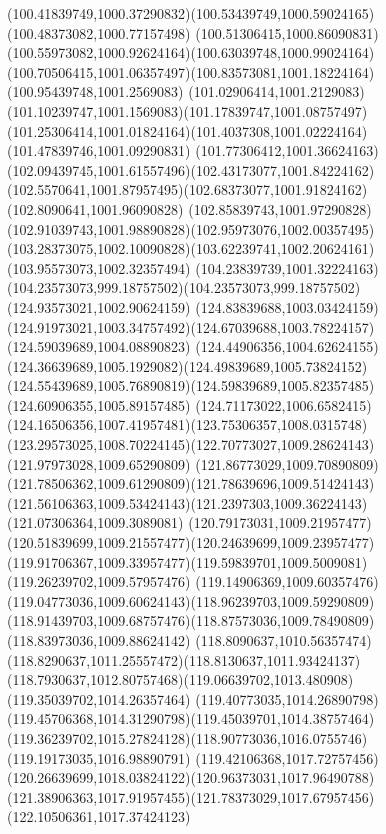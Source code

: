 {    \curveto(100.41839749,1000.37290832)(100.53439749,1000.59024165)(100.48373082,1000.77157498)
    \curveto(100.51306415,1000.86090831)(100.55973082,1000.92624164)(100.63039748,1000.99024164)
    \curveto(100.70506415,1001.06357497)(100.83573081,1001.18224164)(100.95439748,1001.2569083)
    \curveto(101.02906414,1001.2129083)(101.10239747,1001.1569083)(101.17839747,1001.08757497)
    \curveto(101.25306414,1001.01824164)(101.4037308,1001.02224164)(101.47839746,1001.09290831)
    \curveto(101.77306412,1001.36624163)(102.09439745,1001.61557496)(102.43173077,1001.84224162)
    \curveto(102.5570641,1001.87957495)(102.68373077,1001.91824162)(102.8090641,1001.96090828)
    \curveto(102.85839743,1001.97290828)(102.91039743,1001.98890828)(102.95973076,1002.00357495)
    \curveto(103.28373075,1002.10090828)(103.62239741,1002.20624161)(103.95573073,1002.32357494)
    \curveto(104.23839739,1001.32224163)(104.23573073,999.18757502)(104.23573073,999.18757502)
    \lineto(124.93573021,1002.90624159)
    \lineto(124.83839688,1003.03424159)
    \curveto(124.91973021,1003.34757492)(124.67039688,1003.78224157)(124.59039689,1004.08890823)
    \curveto(124.44906356,1004.62624155)(124.36639689,1005.1929082)(124.49839689,1005.73824152)
    \curveto(124.55439689,1005.76890819)(124.59839689,1005.82357485)(124.60906355,1005.89157485)
    \curveto(124.71173022,1006.6582415)(124.16506356,1007.41957481)(123.75306357,1008.0315748)
    \curveto(123.29573025,1008.70224145)(122.70773027,1009.28624143)(121.97973028,1009.65290809)
    \curveto(121.86773029,1009.70890809)(121.78506362,1009.61290809)(121.78639696,1009.51424143)
    \curveto(121.56106363,1009.53424143)(121.2397303,1009.36224143)(121.07306364,1009.3089081)
    \curveto(120.79173031,1009.21957477)(120.51839699,1009.21557477)(120.24639699,1009.23957477)
    \curveto(119.91706367,1009.33957477)(119.59839701,1009.5009081)(119.26239702,1009.57957476)
    \curveto(119.14906369,1009.60357476)(119.04773036,1009.60624143)(118.96239703,1009.59290809)
    \curveto(118.91439703,1009.68757476)(118.87573036,1009.78490809)(118.83973036,1009.88624142)
    \curveto(118.8090637,1010.56357474)(118.8290637,1011.25557472)(118.8130637,1011.93424137)
    \curveto(118.7930637,1012.80757468)(119.06639702,1013.480908)(119.35039702,1014.26357464)
    \curveto(119.40773035,1014.26890798)(119.45706368,1014.31290798)(119.45039701,1014.38757464)
    \curveto(119.36239702,1015.27824128)(118.90773036,1016.0755746)(119.19173035,1016.98890791)
    \curveto(119.42106368,1017.72757456)(120.26639699,1018.03824122)(120.96373031,1017.96490788)
    \curveto(121.38906363,1017.91957455)(121.78373029,1017.67957456)(122.10506361,1017.37424123)
}

